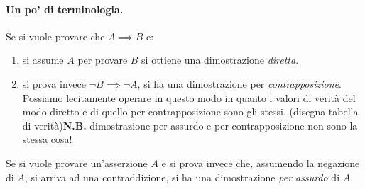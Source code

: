 \documentclass[fontsize = 11 pt, paper=A4, oneside, index=totoc, hyperref]{article}
\theoremstyle{definition}
\theoremstyle{plain}
\begin{document}
\paragraph{Un po' di terminologia.} Se si vuole provare che \(A \implies B\) e:
\begin{enumerate}
  \item si assume \(A\) per provare \(B\) si ottiene una dimostrazione \emph{diretta}.
  \item si prova invece \(\lnot B \implies \lnot A\), si ha una dimostrazione per \emph{contrapposizione}. Possiamo lecitamente operare in questo modo in quanto i valori di verità del modo diretto e di quello per contrapposizione sono gli stessi. (disegna tabella di verità){\bf N.B.} dimostrazione per assurdo e per contrapposizione non sono la stessa cosa!
\end{enumerate}
Se si vuole provare un'asserzione \(A\) e si prova invece che, assumendo la negazione di \(A\), si arriva ad una contraddizione, si ha una dimostrazione \emph{per assurdo} di \(A\).
\end{document}
